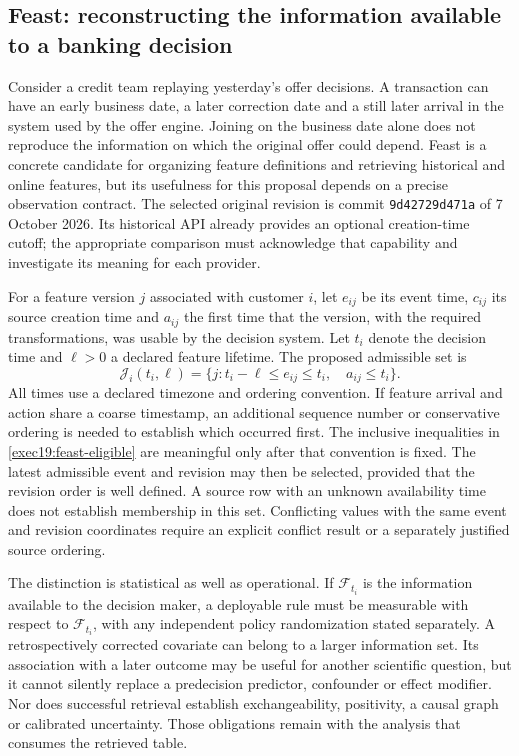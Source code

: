\subsection{Feast: reconstructing the information available to a banking decision}
\label{exec19:feast-clock}

Consider a credit team replaying yesterday's offer decisions. A transaction
can have an early business date, a later correction date and a still later
arrival in the system used by the offer engine. Joining on the business date
alone does not reproduce the information on which the original offer could
depend. Feast is a concrete candidate for organizing feature definitions and
retrieving historical and online features, but its usefulness for this
proposal depends on a precise observation contract. The selected original
revision is commit \texttt{9d42729d471a} of 7 October 2026. Its historical API
already provides an optional creation-time cutoff; the appropriate comparison
must acknowledge that capability and investigate its meaning for each
provider.\citep{exec19_feast_source}

For a feature version $j$ associated with customer $i$, let $e_{ij}$ be its
event time, $c_{ij}$ its source creation time and $a_{ij}$ the first time that
the version, with the required transformations, was usable by the decision
system. Let $t_i$ denote the decision time and $\ell>0$ a declared feature
lifetime. The proposed admissible set is
\begin{equation}
 \mathcal J_i(t_i,\ell)=
 \{j:t_i-\ell\leq e_{ij}\leq t_i,\quad a_{ij}\leq t_i\}.
 \label{exec19:feast-eligible}
\end{equation}
All times use a declared timezone and ordering convention. If feature arrival
and action share a coarse timestamp, an additional sequence number or
conservative ordering is needed to establish which occurred first. The
inclusive inequalities in \eqref{exec19:feast-eligible} are meaningful only
after that convention is fixed. The latest admissible event and revision may
then be selected, provided that the revision order is well defined. A source
row with an unknown availability time does not establish membership in this
set. Conflicting values with the same event and revision coordinates require
an explicit conflict result or a separately justified source ordering.

The distinction is statistical as well as operational. If $\mathcal F_{t_i}$
is the information available to the decision maker, a deployable rule must
be measurable with respect to $\mathcal F_{t_i}$, with any independent policy
randomization stated separately. A retrospectively corrected covariate can
belong to a larger information set. Its association with a later outcome may
be useful for another scientific question, but it cannot silently replace a
predecision predictor, confounder or effect modifier. Nor does successful
retrieval establish exchangeability, positivity, a causal graph or calibrated
uncertainty. Those obligations remain with the analysis that consumes the
retrieved table.


